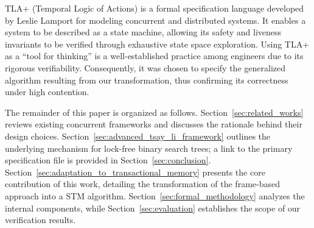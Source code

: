 TLA+ (Temporal Logic of Actions) \cite{LamportTLA} is a formal specification language developed by Leslie Lamport for modeling concurrent and distributed systems. It enables a system to be described as a state machine, allowing its safety and liveness invariants to be verified through exhaustive state space exploration. Using TLA+ as a ``tool for thinking'' is a well-established practice among engineers due to its rigorous verifiability. Consequently, it was chosen to specify the generalized algorithm resulting from our transformation, thus confirming its correctness under high contention.

The remainder of this paper is organized as follows. Section~\ref{sec:related_works} reviews existing concurrent frameworks and discusses the rationale behind their design choices. Section~\ref{sec:advanced_tsay_li_framework} outlines the underlying mechanism for lock-free binary search trees; a link to the primary specification file is provided in Section~\ref{sec:conclusion}. Section~\ref{sec:adaptation_to_transactional_memory} presents the core contribution of this work, detailing the transformation of the frame-based approach into a STM algorithm. Section~\ref{sec:formal_methodology} analyzes the internal components, while Section~\ref{sec:evaluation} establishes the scope of our verification results.
